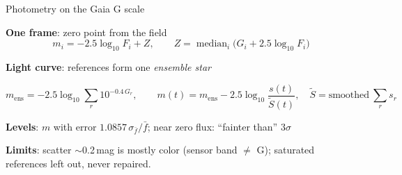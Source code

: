 \begin{frame}{Photometry on the Gaia G scale}
  \tightdisplays
  \footnotesize
  \begin{tightenum}
    \item \textbf{One frame}: zero point from the field
      \[ m_i = -2.5\log_{10} F_i + Z, \qquad Z = \operatorname{median}_i\big(G_i + 2.5\log_{10} F_i\big) \]
    \item \textbf{Light curve}: references form one \emph{ensemble star}
      \begin{tcolorbox}[colback=syzblue!6, colframe=syzblue!40, boxrule=0.4pt, arc=2pt, left=3pt, right=3pt, top=0pt, bottom=0pt]
      \[ m_\mathrm{ens} = -2.5\log_{10}\sum_{r} 10^{-0.4\,G_r}, \qquad
         m(t) = m_\mathrm{ens} - 2.5\log_{10}\frac{s(t)}{\tilde S(t)}, \quad \tilde S = \text{smoothed}\ \textstyle\sum_r s_r \]
      \end{tcolorbox}
    \item \textbf{Levels}: $m$ with error $1.0857\,\sigma_{\bar f}/\bar f$; near zero flux: ``fainter than'' $3\sigma$
  \end{tightenum}
  \vspace{0.6ex}
  {\scriptsize\textbf{Limits}: scatter $\sim$0.2\,mag is mostly color (sensor band $\ne$ G); saturated references left out, never repaired.\par}
\end{frame}

